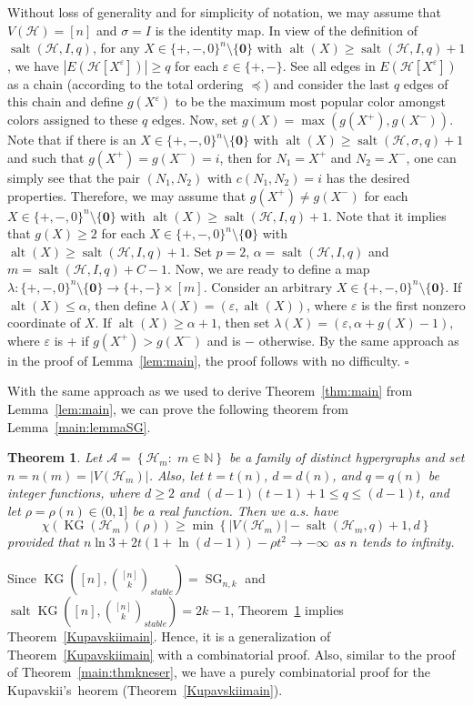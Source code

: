 \documentclass[11pt]{amsart}
\newtheorem{theorem}{Theorem} %
\theoremstyle{definition}
\theoremstyle{remark}
\def\zero{\boldsymbol{0}}
\def\KG{\operatorname{KG}}
\def\SG{\operatorname{SG}}
\def\alt{\operatorname{alt}}
\def\salt{\operatorname{salt}}
\begin{document}
Without loss of generality and for simplicity of notation,  we may assume that $V(\mathcal{H})=[n]$ and  $\sigma=I$ is the identity map.
In view of the definition of $\salt(\mathcal{H},I,q)$, 
for any $X\in\{+,-,0\}^n\setminus\{\zero\}$ with $\alt(X)\geq \salt(\mathcal{H},I,q)+1$, 
we have $|E(\mathcal{H}[X^\varepsilon])|\geq q$ for each $\varepsilon\in\{+,-\}$. See all edges in $E(\mathcal{H}[X^\varepsilon])$ as a chain (according to the total ordering $\preceq$) and 
consider the last $q$ edges of this chain and 
define $g(X^\varepsilon)$  to be the maximum  
most popular color amongst colors assigned  to these $q$ edges.
Now, set $g(X)=\max\left(g(X^+),g(X^-)\right)$. Note that if there is an 
$X\in\{+,-,0\}^n\setminus\{\zero\}$ with $\alt(X)\geq \salt(\mathcal{H},\sigma,q)+1$ 
and such that $g(X^+)=g(X^-)=i$, then 
for $N_1=X^+$ and $N_2=X^-$, 
one can simply see that the pair $(N_1,N_2)$ 
with $c(N_1,N_2)=i$ has the desired properties.
Therefore, we may assume that  $g(X^+)\neq g(X^-)$ 
for each $X\in\{+,-,0\}^n\setminus\{\zero\}$ with $\alt(X)\geq \salt(\mathcal{H},I,q)+1$. 
Note that it implies that $g(X)\geq 2$ for each $X\in\{+,-,0\}^n\setminus\{\zero\}$ with $\alt(X)\geq \salt(\mathcal{H},I,q)+1$. 
Set $p=2$, 
$\alpha=\salt(\mathcal{H},I,q)$ and $m=\salt(\mathcal{H},I,q)+C-1$. 
Now, we are ready to define a map
$\lambda: \{+,-,0\}^n\setminus\{\zero\}\longrightarrow \{+,-\}\times [m]$.
Consider an arbitrary $X\in\{+,-,0\}^n\setminus\{\zero\}$. 
If $\alt(X)\leq \alpha$, then define $\lambda(X)=(\varepsilon, \alt(X))$,
where $\varepsilon$ is the first nonzero coordinate of $X$.  
If $\alt(X)\geq \alpha+1$, then set $\lambda(X)=(\varepsilon,\alpha+g(X)-1)$, 
where $\varepsilon$ is $+$ if $g(X^+)>g(X^-)$ and is $-$ otherwise. By the same approach as in
the proof of Lemma~\ref{lem:main}, the proof follows with no difficulty.  \hfill$\square$


With the same approach as we used to derive Theorem~\ref{thm:main} from Lemma~\ref{lem:main}, we can prove the following theorem from Lemma~\ref{main:lemmaSG}.
\begin{theorem}\label{sgtheorem}
	Let ${\mathcal A}=\left\{\mathcal{H}_m:\; m\in\mathbb{N}\right\}$ be a 
	family of distinct hypergraphs and set
	$n=n(m)=|V(\mathcal{H}_m)|$.  Also, let $t=t(n)$, $d=d(n)$, 
	and $q=q(n)$ be integer functions, where
	$d\geq 2$ and $(d-1)(t-1)+1\leq q\leq (d-1)t$, and 
	 let $\rho=\rho(n)\in(0,1]$ be a real function. 
	Then we a.s. have $$\chi(\KG(\mathcal{H}_m)(\rho))\geq \min\left\{|V(\mathcal{H}_m)|-
	\salt(\mathcal{H}_m,q)+1,d\right\}$$
	provided that ${n\ln3+2t(1+\ln(d-1))}-\rho t^2\rightarrow -\infty$ as $n$ tends to infinity.
\end{theorem}
Since $\KG\left([n],{[n]\choose k}_{stable}\right)=\SG_{n,k}$  
and $\salt\KG\left([n],{[n]\choose k}_{stable}\right)=2k-1$, Theorem~\ref{sgtheorem} implies  
Theorem~\ref{Kupavskiimain}. Hence, it is a generalization of 
Theorem~\ref{Kupavskiimain} with a combinatorial proof. 
Also, similar to the proof of Theorem~\ref{main:thmkneser}, 
we have a purely combinatorial proof for the Kupavskii's~heorem (Theorem~\ref{Kupavskiimain}). \\
\end{document}
